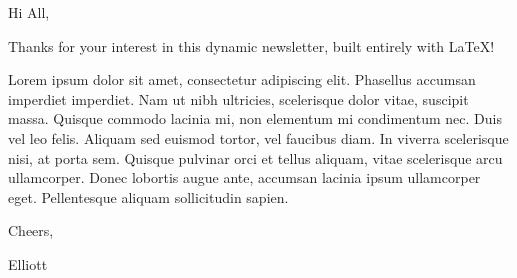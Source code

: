 \begin{page}%
	\Header[%
		title=\inserttitle,
		author=\insertauthor,
		tagline={A procedural \TeX{} newsletter template for professionals},
	]
	
	\Spacer[height=\nlmargin]

	\begin{foreword}[%
		image=img/ep.jpg,
	]%
		Hi All, \newline
		
		Thanks for your interest in this dynamic newsletter, built entirely with \LaTeX{}! \newline
		
		Lorem ipsum dolor sit amet, consectetur adipiscing elit. Phasellus accumsan imperdiet imperdiet. Nam ut nibh ultricies, scelerisque dolor vitae, suscipit massa. Quisque commodo lacinia mi, non elementum mi condimentum nec. Duis vel leo felis. Aliquam sed euismod tortor, vel faucibus diam. In viverra scelerisque nisi, at porta sem. Quisque pulvinar orci et tellus aliquam, vitae scelerisque arcu ullamcorper. Donec lobortis augue ante, accumsan lacinia ipsum ullamcorper eget. Pellentesque aliquam sollicitudin sapien. \newline
		
		Cheers,
		
		Elliott
	\end{foreword}

	\Spacer[height=\nlmargin]

	\begin{AutoColumns}[T,totalwidth=\nlwidth]%
		\begin{Column}[width=0.3]%
			\begin{tile}[%
				bg=main-bg,
				fg=white,
				width=.3\nlwidth-.5\nlmargin-2cm,
			]%
				\lipsum[1]%
			\end{tile}%
		\end{Column}%
		\begin{Column}[width=0.7]%
			\begin{tile}[%
				bg=main-bg!10,
				fg=main-fg,
				width=.7\nlwidth-.5\nlmargin-2cm,
			]%
				\lipsum[1]%
			\end{tile}%
			
		\end{Column}%
	\end{AutoColumns}%
\end{page}